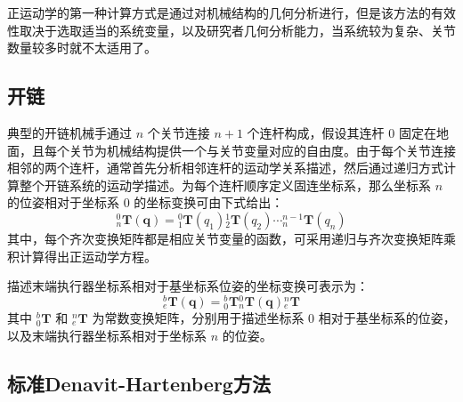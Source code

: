 \documentclass[cn,11pt,chinese,blue,bibstyle=ieeetr]{elegantbook}
\begin{document}
正运动学的第一种计算方式是通过对机械结构的几何分析进行，但是该方法的有效性取决于选取适当的系统变量，以及研究者几何分析能力，当系统较为复杂、关节数量较多时就不太适用了。


\subsection{开链}

典型的开链机械手通过 $n$ 个关节连接 $n+1$ 个连杆构成，假设其连杆 $0$ 固定在地面，且每个关节为机械结构提供一个与关节变量对应的自由度。由于每个关节连接相邻的两个连杆，通常首先分析相邻连杆的运动学关系描述，然后通过递归方式计算整个开链系统的运动学描述。为每个连杆顺序定义固连坐标系，那么坐标系 $n$ 的位姿相对于坐标系 $0$ 的坐标变换可由下式给出：
\begin{equation}\label{link_forward_coordinate_transformation}
{_n^0\bm{T}}\left(\bm{q}\right) = {_1^0\bm{T}}\left(q_1\right){_2^1\bm{T}}\left(q_2\right)\cdots{_n^{n-1}\bm{T}}\left(q_n\right)
\end{equation}
其中，每个齐次变换矩阵都是相应关节变量的函数，可采用递归与齐次变换矩阵乘积计算得出正运动学方程。

描述末端执行器坐标系相对于基坐标系位姿的坐标变换可表示为：
\begin{equation}
{_e^b\bm{T}\left(\bm{q}\right)} = {_0^b\bm{T}}{_n^0\bm{T}\left(\bm{q}\right)}{_e^n\bm{T}}
\end{equation}
其中 $_0^b\bm{T}$ 和 $_e^n\bm{T}$ 为常数变换矩阵，分别用于描述坐标系 $0$ 相对于基坐标系的位姿，以及末端执行器坐标系相对于坐标系 $n$ 的位姿。


\subsection{标准Denavit-Hartenberg方法}
\end{document}
